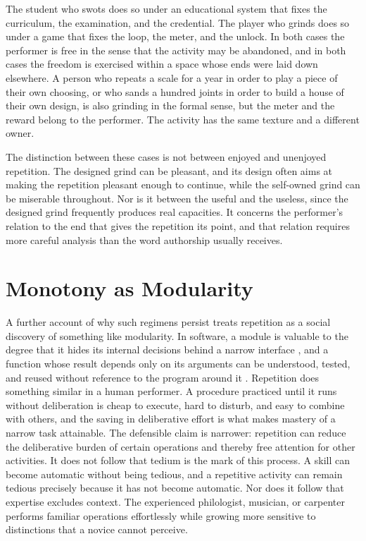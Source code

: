 \documentclass[11pt]{article}
\begin{document}
The student who swots does so under an educational system that fixes the curriculum, the examination, and the credential. The player who grinds does so under a game that fixes the loop, the meter, and the unlock. In both cases the performer is free in the sense that the activity may be abandoned, and in both cases the freedom is exercised within a space whose ends were laid down elsewhere. A person who repeats a scale for a year in order to play a piece of their own choosing, or who sands a hundred joints in order to build a house of their own design, is also grinding in the formal sense, but the meter and the reward belong to the performer. The activity has the same texture and a different owner.

The distinction between these cases is not between enjoyed and unenjoyed repetition. The designed grind can be pleasant, and its design often aims at making the repetition pleasant enough to continue, while the self-owned grind can be miserable throughout. Nor is it between the useful and the useless, since the designed grind frequently produces real capacities. It concerns the performer's relation to the end that gives the repetition its point, and that relation requires more careful analysis than the word authorship usually receives.

\section{Monotony as Modularity}

A further account of why such regimens persist treats repetition as a social discovery of something like modularity. In software, a module is valuable to the degree that it hides its internal decisions behind a narrow interface \cite{parnas1972}, and a function whose result depends only on its arguments can be understood, tested, and reused without reference to the program around it \cite{hughes1989}. Repetition does something similar in a human performer. A procedure practiced until it runs without deliberation is cheap to execute, hard to disturb, and easy to combine with others, and the saving in deliberative effort is what makes mastery of a narrow task attainable. The defensible claim is narrower: repetition can reduce the deliberative burden of certain operations and thereby free attention for other activities. It does not follow that tedium is the mark of this process. A skill can become automatic without being tedious, and a repetitive activity can remain tedious precisely because it has not become automatic. Nor does it follow that expertise excludes context. The experienced philologist, musician, or carpenter performs familiar operations effortlessly while growing more sensitive to distinctions that a novice cannot perceive.
\end{document}
